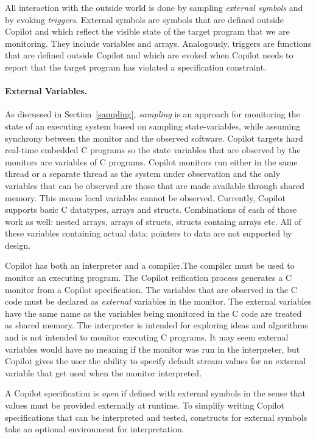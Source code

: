 All interaction with the outside world is done by sampling \emph{external
  symbols} and by evoking \emph{triggers}.  External symbols are symbols that
are defined outside Copilot and which reflect the visible state of the target
program that we are monitoring.  They include variables and arrays.
Analogously, triggers are functions that are defined outside Copilot and which
are evoked when Copilot needs to report that the target program has violated a
specification constraint.

\paragraph{External Variables.}


As discussed in Section~\ref{sampling}, \emph{sampling} is an approach
for monitoring the state of an executing system based on sampling
state-variables, while assuming synchrony between the monitor and the
observed software. Copilot targets hard real-time embedded C programs
so the state variables that are observed by the monitors are variables
of C programs. Copilot monitors run either in the same thread or a
separate thread as the system under observation and the only variables
that can be observed are those that are made available through shared
memory. This means local variables cannot be observed. Currently,
Copilot supports basic C datatypes, arrays and structs. Combinations of each of
those work as well: nested arrays, arrays of structs, structs containg arrays
etc. All of these variables containing actual data; pointers to data are not
supported by design.


Copilot has both an interpreter and a compiler.The compiler must be
used to monitor an executing program. The Copilot reification process
generates a C monitor from a Copilot specification. The variables that
are observed in the C code must be declared as \emph{external}
variables in the monitor. The external variables have the same name as
the variables being monitored in the C code are treated as shared
memory. The interpreter is intended for exploring ideas and algorithms
and is not intended to monitor executing  C
programs. It may seem external variables would have no meaning if the
monitor was run in the interpreter, but Copilot gives the user the
ability to specify default stream values for an external variable that
get used when the monitor interpreted.

 A Copilot specification is \emph{open} if defined with external symbols in the
sense that values must be provided externally at runtime.  To simplify writing
Copilot specifications that can be interpreted and tested, constructs for
external symbols take an optional environment for interpretation.

